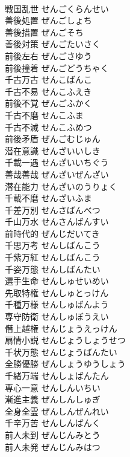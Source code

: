 \documentclass[8pt]{extreport}
\begin{document}
\begin{CJK}{UTF8}{min}
\\	戦国乱世	せんごくらんせい	
\\	善後処置	ぜんごしょち	
\\	善後措置	ぜんごそち	
\\	善後対策	ぜんごたいさく	
\\	前後左右	ぜんごさゆう	
\\	前後撞着	ぜんごどうちゃく	
\\	千古万古	せんこばんこ	
\\	千古不易	せんこふえき	
\\	前後不覚	ぜんごふかく	
\\	千古不磨	せんこふま	
\\	千古不滅	せんこふめつ	
\\	前後矛盾	ぜんごむじゅん	
\\	潜在意識	せんざいいしき	
\\	千載一遇	せんざいいちぐう	
\\	善哉善哉	ぜんざいぜんざい	
\\	潜在能力	せんざいのうりょく	
\\	千載不磨	せんざいふま	
\\	千差万別	せんさばんべつ	
\\	千山万水	せんさんばんすい	
\\	前時代的	ぜんじだいてき	
\\	千思万考	せんしばんこう	
\\	千紫万紅	せんしばんこう	
\\	千姿万態	せんしばんたい	
\\	選手生命	せんしゅせいめい	
\\	先取特権	せんしゅとっけん	
\\	千種万様	せんしゅばんよう	
\\	専守防衛	せんしゅぼうえい	
\\	僭上越権	せんじょうえっけん	
\\	扇情小説	せんじょうしょうせつ	
\\	千状万態	せんじょうばんたい	
\\	全勝優勝	ぜんしょうゆうしょう	
\\	千緒万端	せんしょばんたん	
\\	専心一意	せんしんいちい	
\\	漸進主義	ぜんしんしゅぎ	
\\	全身全霊	ぜんしんぜんれい	
\\	千辛万苦	せんしんばんく	
\\	前人未到	ぜんじんみとう	
\\	前人未発	ぜんじんみはつ	

\end{CJK}
\end{document}
